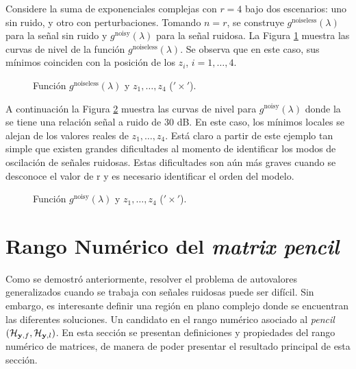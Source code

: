 		Considere la suma de exponenciales complejas con $r=4$ bajo dos escenarios: uno sin ruido, y otro con perturbaciones. Tomando $n=r$, se construye $g^{\text{noiseless}}(\lambda)$ para la señal sin ruido y $g^{\text{noisy}}(\lambda)$ para la señal ruidosa. La Figura \ref{Fig:PseudoSpectra_noiseless} muestra las curvas de nivel de la función $g^{\text{noiseless}}(\lambda)$. Se observa que en este caso, sus mínimos coinciden con la posición de los $z_i$, $i = 1,\ldots,4$.
		
		\begin{figure}[ht]
			\centering
			\resizebox{0.5\linewidth}{!}{}
			\caption{Función $g^{\text{noiseless}}(\lambda)$ y $z_1,\ldots,z_4$ ($'\times'$).}
			\label{Fig:PseudoSpectra_noiseless}
		\end{figure}
		
		A continuación la Figura \ref{Fig:PseudoSpectra_noisy} muestra las curvas de nivel para $g^{\text{noisy}}(\lambda)$ donde la se tiene una relación señal a ruido de 30 dB. En este caso, los mínimos locales se alejan de los valores reales de $z_1, \ldots, z_4$. Está claro a partir de este ejemplo tan simple que existen grandes dificultades al momento de identificar los modos de oscilación de señales ruidosas. Estas dificultades son aún más graves cuando se desconoce el valor de r y es necesario identificar el orden del modelo.
		
		\begin{figure}[ht]
			\centering
			\resizebox{0.5\linewidth}{!}{}
			\caption{Función $g^{\text{noisy}}(\lambda)$ y $z_1,\ldots,z_4$ ($'\times'$).}
			\label{Fig:PseudoSpectra_noisy}
		\end{figure}
		
	\section{Rango Numérico del \emph{matrix pencil}}
	
		Como se demostró anteriormente, resolver el problema de autovalores generalizados cuando se trabaja con señales ruidosas puede ser difícil. Sin embargo, es interesante definir una región en plano complejo donde se encuentran las diferentes soluciones. Un candidato en el rango numérico asociado al \emph{pencil} $(\mathcal{H}_{\mathbf{y},f},\mathcal{H}_{\mathbf{y},l})$. En esta sección se presentan definiciones y propiedades del rango numérico de matrices, de manera de poder presentar el resultado principal de esta sección. \cite{Horn1991}
		
